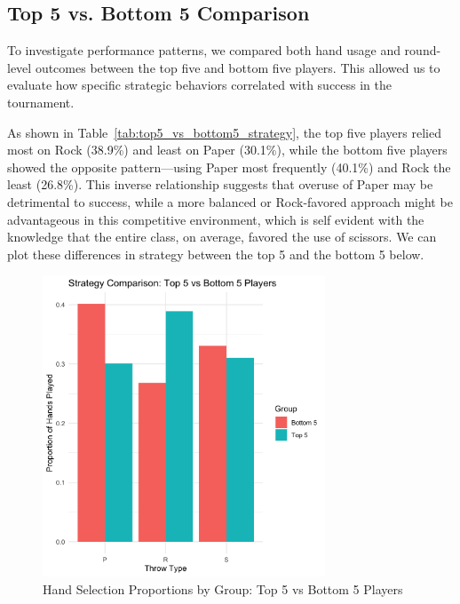 \documentclass[12pt]{article}
\begin{document}
\subsection*{Top 5 vs. Bottom 5 Comparison}

To investigate performance patterns, we compared both hand usage and round-level outcomes between the top five and bottom five players. This allowed us to evaluate how specific strategic behaviors correlated with success in the tournament.

As shown in Table~\ref{tab:top5_vs_bottom5_strategy}, the top five players relied most on Rock (38.9\%) and least on Paper (30.1\%), while the bottom five players showed the opposite pattern—using Paper most frequently (40.1\%) and Rock the least (26.8\%). This inverse relationship suggests that overuse of Paper may be detrimental to success, while a more balanced or Rock-favored approach might be advantageous in this competitive environment, which is self evident with the knowledge that the entire class, on average, favored the use of scissors. We can plot these differences in strategy between the top 5 and the bottom 5 below.

\begin{figure}[H]
\centering
\includegraphics[width=0.75\textwidth]{figures/Strategy_Comparison_T5vB5.png}
\caption{Hand Selection Proportions by Group: Top 5 vs Bottom 5 Players}
\label{fig:strategy_comparison_T5vB5}
\end{figure}
\end{document}
